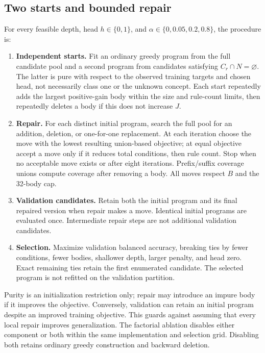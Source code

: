 \documentclass[a4paper,fleqn,review]{cas-sc}
\begin{document}
\subsection{Two starts and bounded repair}\label{sec:search}
For every feasible depth, head $h\in\{0,1\}$, and $\alpha\in\{0,0.05,0.2,0.8\}$, the procedure is:
\begin{enumerate}[leftmargin=*,itemsep=3pt]
\item \textbf{Independent starts.} Fit an ordinary greedy program from the full candidate pool and a second program from candidates satisfying $C_r\cap N=\varnothing$. The latter is pure with respect to the observed training targets and chosen head, not necessarily class one or the unknown concept. Each start repeatedly adds the largest positive-gain body within the size and rule-count limits, then repeatedly deletes a body if this does not increase $J$.
\item \textbf{Repair.} For each distinct initial program, search the full pool for an addition, deletion, or one-for-one replacement. At each iteration choose the move with the lowest resulting union-based objective; at equal objective accept a move only if it reduces total conditions, then rule count. Stop when no acceptable move exists or after eight iterations. Prefix/suffix coverage unions compute coverage after removing a body. All moves respect $B$ and the 32-body cap.
\item \textbf{Validation candidates.} Retain both the initial program and its final repaired version when repair makes a move. Identical initial programs are evaluated once. Intermediate repair steps are not additional validation candidates.
\item \textbf{Selection.} Maximize validation balanced accuracy, breaking ties by fewer conditions, fewer bodies, shallower depth, larger penalty, and head zero. Exact remaining ties retain the first enumerated candidate. The selected program is not refitted on the validation partition.
\end{enumerate}
Purity is an initialization restriction only; repair may introduce an impure body if it improves the objective. Conversely, validation can retain an initial program despite an improved training objective. This guards against assuming that every local repair improves generalization. The factorial ablation disables either component or both within the same implementation and selection grid. Disabling both retains ordinary greedy construction and backward deletion.
\end{document}
